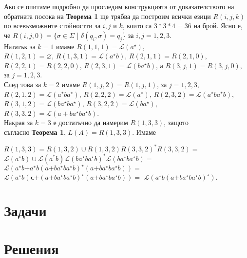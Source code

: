 \documentclass{article}
\newcommand{\bleft}{
    \boldsymbol{\left(\right.}
}
\newcommand{\bright}{
    \boldsymbol{\left.\right)}
}
\newcommand{\bplus}{
    \boldsymbol{+}
}
\newcommand{\bepsilon}{
    \boldsymbol{\epsilon}
}
\begin{document}
    Ако се опитаме подробно да проследим конструкцията от доказателството 
    на обратната посока на \textbf{Теорема 1} ще трябва да построим всички езици 
    $R(i,j,k)$ по всевъзможните стойностти за $i,j$ и $k$, които са $3*3*4 = 36$ на брой.
    Ясно е, че $R(i,j,0) = \{\sigma \in \Sigma$ | $\delta(q_i,\sigma) = q_j$\} за $i,j = 1,2,3$. \\
    \vspace{10pt}
    Нататък за $k = 1$ имаме $R(1,1,1) = \mathscr{L}(a^\star)$, \\ $R(1,2,1) = \varnothing$, 
    $R(1,3,1) = \mathscr{L}(a^\star b)$, $R(2,1,1) = R(2,1,0)$, \\ $R(2,2,1) = R(2,2,0)$,
    $R(2,3,1) = \mathscr{L}(b a^\star b)$, а $R(3,j,1) = R(3,j,0)$, \\ за $j=1,2,3$. \\
    \vspace{10pt}
    След това за $k = 2$ имаме $R(1,j,2) = R(1,j,1)$, за $j=1,2,3$, \\
    $R(2,1,2) = \mathscr{L}(a^\star b a^\star)$, $R(2,2,2) = \mathscr{L}(a^\star)$,
    $R(2,3,2) = \mathscr{L}(a^\star b a^\star b)$, \\ $R(3,1,2) = \mathscr{L}(b a^\star b a^\star)$,
    $R(3,2,2) = \mathscr{L}(b a^\star)$, $R(3,3,2) = \mathscr{L}(a + b a^\star b a^\star b)$.  \\
    \vspace{10pt}
    Накрая за $k = 3$ е достатъчно да намерим $R(1,3,3)$, защото \\
    съгласно \textbf{Теорема 1}, $L(A) = R(1,3,3)$. Имаме
    \begin{center}
        $R(1,3,3) = R(1,3,2) \cup R(1,3,2)R(3,3,2)^*R(3,3,2) =$
        $\mathscr{L}(a^\star b) \cup \mathscr{L}(a^*b)\mathscr{L}(b a^\star b a^\star b)^*\mathscr{L}(b a^\star b a^\star b) =$
        $\mathscr{L}(a^\star b \bplus a ^\star b \bleft a \bplus b a^\star b a^\star b \bright ^\star \bleft a \bplus b a^\star b a^\star b \bright) =$
        $\mathscr{L}(a^\star b \bleft \bepsilon \bplus \bleft a \bplus b a^\star b a^\star b \bright ^\star \bleft a \bplus b a^\star b a^\star b \bright) =$
        $\mathscr{L}(a^\star b \bleft a \bplus b a^\star b a^\star b \bright^\star)$.
    \end{center}

\section{Задачи}

\vspace{25pt}

\section{Решения}
    
\end{document}

